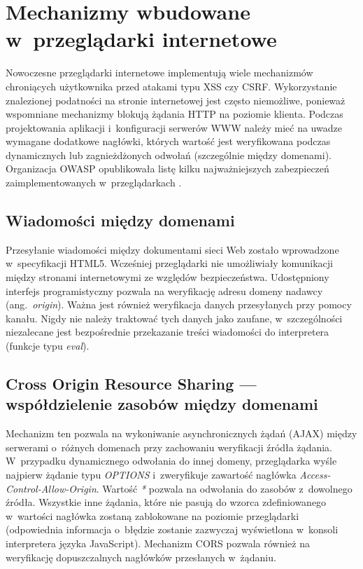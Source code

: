 \documentclass[12pt,a4paper,polish,thesis]{dcsbook}
\begin{document}
\section{Mechanizmy wbudowane w~przeglądarki internetowe}
Nowoczesne przeglądarki internetowe implementują wiele mechanizmów chroniących użytkownika przed atakami typu XSS czy CSRF. Wykorzystanie znalezionej podatności na stronie internetowej jest często niemożliwe, ponieważ wspomniane mechanizmy blokują żądania HTTP na poziomie klienta. Podczas projektowania aplikacji i~konfiguracji serwerów WWW należy mieć na uwadze wymagane dodatkowe nagłówki, których wartość jest weryfikowana podczas dynamicznych lub zagnieżdżonych odwołań (szczególnie między domenami). Organizacja OWASP opublikowała listę kilku najważniejszych zabezpieczeń zaimplementowanych w~przeglądarkach \cite{html5security}.

\subsection{Wiadomości między domenami}
Przesyłanie wiadomości między dokumentami sieci Web zostało wprowadzone w~specyfikacji HTML5. Wcześniej przeglądarki nie umożliwiały komunikacji między stronami internetowymi ze względów bezpieczeństwa. Udostępniony interfejs programistyczny pozwala na weryfikację adresu domeny nadawcy (ang.~\textit{origin}). Ważna jest również weryfikacja danych przesyłanych przy pomocy kanału. Nigdy nie należy traktować tych danych jako zaufane, w~szczególności niezalecane jest bezpośrednie przekazanie treści wiadomości do interpretera (funkcje typu \textit{eval}).

\subsection{Cross Origin Resource Sharing --- współdzielenie zasobów między domenami}
Mechanizm ten pozwala na wykoniwanie asynchronicznych żądań (AJAX) między serwerami o~różnych domenach przy zachowaniu weryfikacji źródła żądania. W~przypadku dynamicznego odwołania do innej domeny, przeglądarka wyśle najpierw żądanie typu \textit{OPTIONS} i~zweryfikuje zawartość nagłówka \textit{Access-Control-Allow-Origin}. Wartość \textit{*} pozwala na odwołania do zasobów z~dowolnego źródła. Wszystkie inne żądania, które nie pasują do wzorca zdefiniowanego w~wartości nagłówka zostaną zablokowane na poziomie przeglądarki (odpowiednia informacja o~błędzie zostanie zazwyczaj wyświetlona w~konsoli interpretera języka JavaScript). Mechanizm CORS pozwala również na weryfikację dopuszczalnych nagłówków przesłanych w~żądaniu.
\end{document}
